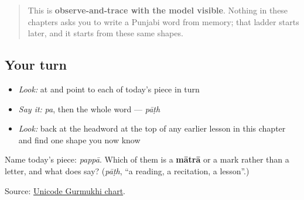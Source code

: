 \begin{quote}
This is \textbf{observe-and-trace with the model visible}. Nothing in these chapters asks you to write a Punjabi word from memory; that ladder starts later, and it starts from these same shapes.
\end{quote}

\subsection*{Your turn}
\begin{itemize}
\raggedright
  \item \emph{Look:} at \textbf{} and point to each of today's piece in turn
  \item \emph{Say it:} \emph{pa}, then the whole word — \emph{pāṭh}
  \item \emph{Look:} back at the headword at the top of any earlier lesson in this chapter and find one shape you now know
\end{itemize}

\begin{tcolorbox}[breakable,colback=teal!4,colframe=teal!35!black,title={Before you move on}]
Name today's piece: \emph{pappā}. Which of them is a \textbf{mātrā} or a mark rather than a letter, and what does \textbf{} say? (\emph{pāṭh}, “a reading, a recitation, a lesson”.)

Source: \href{https://www.unicode.org/charts/PDF/U0A00.pdf}{Unicode Gurmukhi chart}.
\end{tcolorbox}
